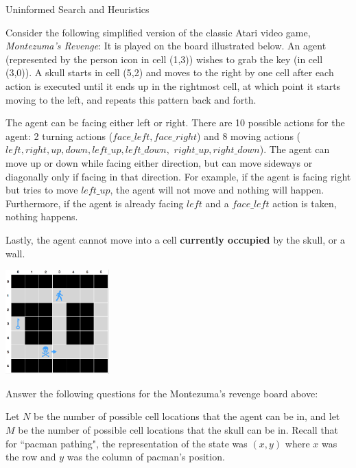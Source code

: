 \newcommand{\floor}[1]{\lfloor #1 \rfloor}

\begin{problem}{Uninformed Search and Heuristics}

Consider the following simplified version of the classic Atari video game, \textit{Montezuma's Revenge}: It is played on the board illustrated below. An agent (represented by the person icon in cell (1,3)) wishes to grab the key (in cell (3,0)). A skull starts in cell (5,2) and moves to the right by one cell after each action is executed until it ends up in the rightmost cell, at which point it starts moving to the left, and repeats this pattern back and forth. 

The agent can be facing either left or right. There are 10 possible actions for the agent: 2 turning actions ($face\_left, face\_right$) and 8 moving actions ($left, right, up, down, left\_up, left\_down,$ $right\_up, right\_down$). The agent can move up or down while facing either direction, but can move sideways or diagonally only if facing in that direction. For example, if the agent is facing right but tries to move $left\_up$, the agent will not move and nothing will happen. Furthermore, if the agent is already facing $left$ and a $face\_left$ action is taken, nothing happens.

Lastly, the agent cannot move into a cell \textbf{currently occupied} by the skull, or a wall. 


\begin{center}
\includegraphics[width=0.3\textwidth]{figures/montezuma_revised.pdf}
\label{fig:montezuma}
\end{center}

\begin{question}
Answer the following questions for the Montezuma's revenge board above:

\vspace{0.1in}

\begin{subquestion}[7]
Let $N$ be the number of possible cell locations that the agent can be in, and let $M$ be the number of possible cell locations that the skull can be in. Recall that for ``pacman pathing", the representation of the state was $(x,y)$ where $x$ was the row and $y$ was the column of pacman's position.  


\end{subquestion}
\end{question}
\end{problem}
